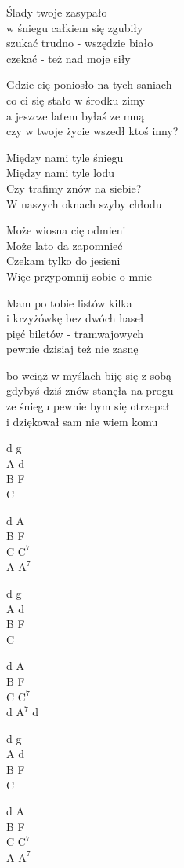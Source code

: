 \begin{text}
    Ślady twoje zasypało\\
    w śniegu całkiem się zgubiły\\
    szukać trudno - wszędzie biało\\
    czekać - też nad moje siły

    Gdzie cię poniosło na tych saniach\\
    co ci się stało w środku zimy\\
    a jeszcze latem byłaś ze mną\\
    czy w twoje życie wszedł ktoś inny?

    \vin Między nami tyle śniegu\\
    \vin Między nami tyle lodu\\
    \vin Czy trafimy znów na siebie?\\
    \vin W naszych oknach szyby chłodu

    \vin Może wiosna cię odmieni\\
    \vin Może lato da zapomnieć\\
    \vin Czekam tylko do jesieni\\
    \vin Więc przypomnij sobie o mnie

    Mam po tobie listów kilka\\
    i krzyżówkę bez dwóch haseł\\
    pięć biletów - tramwajowych\\
    pewnie dzisiaj też nie zasnę

    bo wciąż w myślach biję się z sobą\\
    gdybyś dziś znów stanęła na progu\\
    ze śniegu pewnie bym się otrzepał\\
    i dziękował sam nie wiem komu
\end{text}
\begin{chord}
    d g\\
    A d\\
    B F\\
    C

    d A\\
    B F\\
    C $\mathrm{C^{7}}$\\
    A $\mathrm{A^{7}}$

    d g\\
    A d\\
    B F\\
    C

    d A\\
    B F\\
    C $\mathrm{C^{7}}$\\
    d $\mathrm{A^{7}}$ d

    d g\\
    A d\\
    B F\\
    C

    d A\\
    B F\\
    C $\mathrm{C^{7}}$\\
    A $\mathrm{A^{7}}$
\end{chord}
